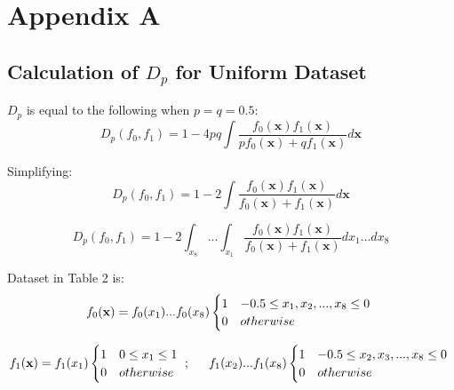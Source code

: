 \documentclass{article}
\begin{document}
\newpage
	\section*{Appendix A}
	\subsection*{Calculation of $D_p$ for Uniform Dataset}
	
	$D_p$ is equal to the following when $p=q=0.5$:
	\begin{equation}
	D_p(f_0,f_1)=1-4pq\int \frac{f_0(\textbf{x}){f_1}(\textbf{x})}{p{f_0}(\textbf{x})+q{f_1}(\textbf{x})}d\textbf{x}
	\end{equation}
	
	\noindent Simplifying:
	\begin{equation}
		D_p(f_0,f_1)=1-2\int \frac{f_0(\textbf{x}){f_1}(\textbf{x})}{{f_0}(\textbf{x})+{f_1}(\textbf{x})}d\textbf{x}
	\end{equation}

	
	
	
	\begin{equation}
		D_p(f_0,f_1)=1-2\int_{x_8} ... \int_{x_1} \frac{f_0(\textbf{x}){f_1}(\textbf{x})}{{f_0}(\textbf{x})+{f_1}(\textbf{x})}dx_1... dx_8
	\end{equation}
		
	\noindent Dataset in Table 2 is:
	\begin{equation}
	f_0(\textbf{x}) =  f_0(x_1)...f_0(x_8)
	\begin{cases} 
	1 & -0.5\leq x_1,x_2,...,x_8 \space \leq 0 \\

	0 & otherwise 
	\end{cases}
	\
	\end{equation}
	
	\begin{equation}
	f_1(\textbf{x}) =	f_1(x_1)
	\begin{cases} 
	1 & 0\leq x_1 \space  \leq 1 \\
	
	0 & otherwise 
	\end{cases}
	\
	; \indent f_1(x_2)...f_1(x_8)
	\begin{cases} 
	1 & -0.5\leq x_2,x_3,...,x_8 \space \leq 0 \\
	
	0 & otherwise 
	\end{cases}
	\
	\end{equation}
	\noindent 
		
\end{document}
